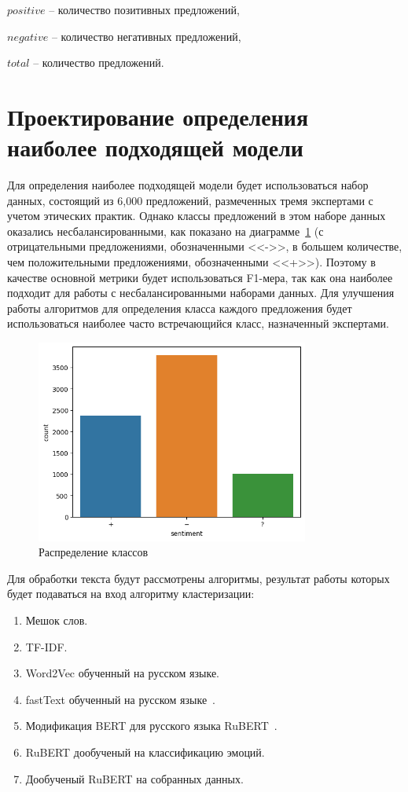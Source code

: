 \documentclass[PI, VKR]{HSEUniversity}
\begin{document}
\(positive\) -- количество позитивных предложений,

\(negative\) -- количество негативных предложений,

\(total\) -- количество предложений.
\section{Проектирование определения наиболее подходящей модели}
\label{sec:orge884b5e}
Для определения наиболее подходящей модели будет использоваться набор данных, состоящий из 6,000 предложений, размеченных тремя экспертами с учетом этических практик. Однако классы предложений в этом наборе данных оказались несбалансированными, как показано на диаграмме~\ref{fig:class_balance} (с отрицательными предложениями, обозначенными {}<<->>{}, в большем количестве, чем положительными предложениями, обозначенными {}<<+>>{}). Поэтому в качестве основной метрики будет использоваться F1-мера, так как она наиболее подходит для работы с несбалансированными наборами данных. Для улучшения работы алгоритмов для определения класса каждого предложения будет использоваться наиболее часто встречающийся класс, назначенный экспертами.

\begin{figure}[h!]
\centering
\includegraphics[width=0.8\textwidth]{img/class_balance.png}
\caption{\label{fig:class_balance}Распределение классов}
\end{figure}

Для обработки текста будут рассмотрены алгоритмы, результат работы которых будет подаваться на вход алгоритму кластеризации:
\begin{enumerate}
\item Мешок слов.
\item TF-IDF.
\item Word2Vec обученный на русском языке.
\item fastText обученный на русском языке~\autocite{korogodina_evaluation_2020}.
\item Модификация BERT для русского языка RuBERT~\autocite{kuratov_adaptation_2019}.
\item RuBERT дообученый на классификацию эмоций.
\item Дообученый RuBERT на собранных данных.
\end{enumerate}
\end{document}
